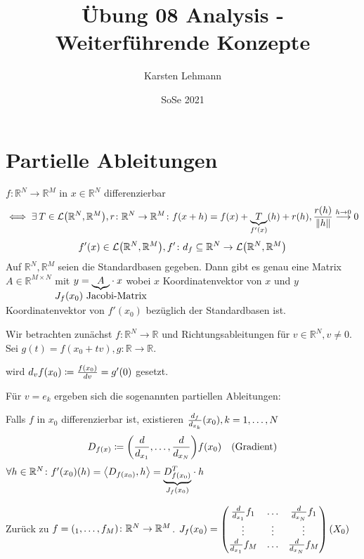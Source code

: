 \documentclass{scrreprt}
\author{Karsten Lehmann}
\date{SoSe 2021}
\title{Übung 08 Analysis - Weiterführende Konzepte}
\newcommand\skalprod[1]{\left\langle #1 \right\rangle}
\begin{document}
\section*{Partielle Ableitungen}

$f \colon \mathbb{R}^N \to \mathbb{R}^M$ in $x \in \mathbb{R}^N$ differenzierbar
\[
  \iff \exists \: T \in \mathcal{L}\qty(\mathbb{R}^N, \mathbb{R}^M),
  r \colon \mathbb{R}^N \to \mathbb{R}^M \colon f(x + h) =
  f(x) + \underset{f'(x)}{\underbrace{T}}(h) + r(h),
  \frac{r(h)}{\norm{h}} \overset{h \to 0}\longrightarrow 0
\]
\[
  f'(x) \in \mathcal{L}\qty(\mathbb{R}^N, \mathbb{R}^M),
  f' \colon d_f \subseteq \mathbb{R}^N \to \mathcal{L}\qty(\mathbb{R}^N, \mathbb{R}^M)
\]
Auf $\mathbb{R}^N, \mathbb{R}^M$ seien die Standardbasen gegeben.
Dann gibt es genau eine Matrix $A \in \mathbb{R}^{M \times N}$ mit
$y = \underset{\makebox[0pt]{$J_f(x_0)$ Jacobi-Matrix}}{\underbrace{A}} \cdot x$
wobei $x$ Koordinatenvektor von $x$ und $y$ Koordinatenvektor von $f'(x_0)$
bezüglich der Standardbasen ist.

Wir betrachten zunächst $f \colon \mathbb{R}^N \to \mathbb{R}$ und
Richtungsableitungen für $v \in \mathbb{R}^N, v \ne 0$.
Sei $g(t) = f(x_0 + tv), g \colon \mathbb{R} \to \mathbb{R}$.
wird $d_v f\qty(x_0) \coloneqq \frac{f\qty(x_0)}{dv} = g'(0)$ gesetzt.

Für $v = e_k$ ergeben sich die sogenannten partiellen Ableitungen:
Falls $f$ in $x_0$ differenzierbar ist, existieren
$\frac{d_f}{d_{x_k}}\qty(x_0), k = 1, \ldots, N$
\[
  D_{f(x)} \coloneqq \qty(\frac{d}{d_{x_1}}, \ldots, \frac{d}{d_{x_N}})f\qty(x_0) \quad\text{(Gradient)}
\]
$\forall h \in \mathbb{R}^N \colon f'\qty(x_0)(h) = \skalprod{D_{f\qty(x_0)}, h}
= \underset{J_f\qty(x_0)}{\underbrace{D_{f\qty(x_0)}^T}} \cdot h$

Zurück zu $f = \qty(_1, \ldots, f_M) \colon \mathbb{R}^N \to \mathbb{R}^M$.
$J_f\qty(x_0) = \begin{pmatrix}
  \frac{d}{d_{x_1}}f_1 & \ldots  & \frac{d}{d_{x_N}}f_1 \\
  \vdots & \vdots & \vdots \\
  \frac{d}{d_{x_1}}f_M & \ldots & \frac{d}{d_{x_N}}f_M
\end{pmatrix}\qty(X_0)$
\end{document}

